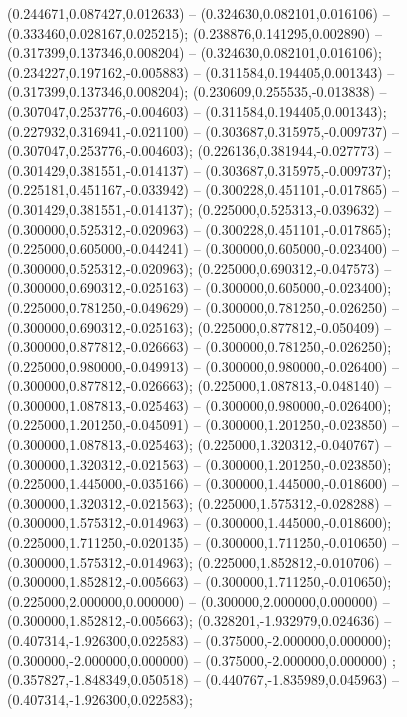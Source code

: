  (0.244671,0.087427,0.012633) -- (0.324630,0.082101,0.016106) -- (0.333460,0.028167,0.025215);
 (0.238876,0.141295,0.002890) -- (0.317399,0.137346,0.008204) -- (0.324630,0.082101,0.016106);
 (0.234227,0.197162,-0.005883) -- (0.311584,0.194405,0.001343) -- (0.317399,0.137346,0.008204);
 (0.230609,0.255535,-0.013838) -- (0.307047,0.253776,-0.004603) -- (0.311584,0.194405,0.001343);
 (0.227932,0.316941,-0.021100) -- (0.303687,0.315975,-0.009737) -- (0.307047,0.253776,-0.004603);
 (0.226136,0.381944,-0.027773) -- (0.301429,0.381551,-0.014137) -- (0.303687,0.315975,-0.009737);
 (0.225181,0.451167,-0.033942) -- (0.300228,0.451101,-0.017865) -- (0.301429,0.381551,-0.014137);
 (0.225000,0.525313,-0.039632) -- (0.300000,0.525312,-0.020963) -- (0.300228,0.451101,-0.017865);
 (0.225000,0.605000,-0.044241) -- (0.300000,0.605000,-0.023400) -- (0.300000,0.525312,-0.020963);
 (0.225000,0.690312,-0.047573) -- (0.300000,0.690312,-0.025163) -- (0.300000,0.605000,-0.023400);
 (0.225000,0.781250,-0.049629) -- (0.300000,0.781250,-0.026250) -- (0.300000,0.690312,-0.025163);
 (0.225000,0.877812,-0.050409) -- (0.300000,0.877812,-0.026663) -- (0.300000,0.781250,-0.026250);
 (0.225000,0.980000,-0.049913) -- (0.300000,0.980000,-0.026400) -- (0.300000,0.877812,-0.026663);
 (0.225000,1.087813,-0.048140) -- (0.300000,1.087813,-0.025463) -- (0.300000,0.980000,-0.026400);
 (0.225000,1.201250,-0.045091) -- (0.300000,1.201250,-0.023850) -- (0.300000,1.087813,-0.025463);
 (0.225000,1.320312,-0.040767) -- (0.300000,1.320312,-0.021563) -- (0.300000,1.201250,-0.023850);
 (0.225000,1.445000,-0.035166) -- (0.300000,1.445000,-0.018600) -- (0.300000,1.320312,-0.021563);
 (0.225000,1.575312,-0.028288) -- (0.300000,1.575312,-0.014963) -- (0.300000,1.445000,-0.018600);
 (0.225000,1.711250,-0.020135) -- (0.300000,1.711250,-0.010650) -- (0.300000,1.575312,-0.014963);
 (0.225000,1.852812,-0.010706) -- (0.300000,1.852812,-0.005663) -- (0.300000,1.711250,-0.010650);
 (0.225000,2.000000,0.000000) -- (0.300000,2.000000,0.000000) -- (0.300000,1.852812,-0.005663);
 (0.328201,-1.932979,0.024636) -- (0.407314,-1.926300,0.022583) -- (0.375000,-2.000000,0.000000);
 (0.300000,-2.000000,0.000000) -- (0.375000,-2.000000,0.000000) ;
 (0.357827,-1.848349,0.050518) -- (0.440767,-1.835989,0.045963) -- (0.407314,-1.926300,0.022583);
